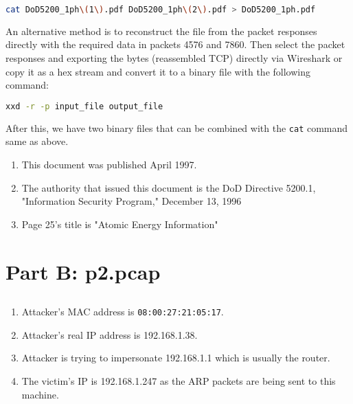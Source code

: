 \documentclass[12pt]{exam}
\begin{document}
\begin{lstlisting}[language=bash]
    cat DoD5200_1ph\(1\).pdf DoD5200_1ph\(2\).pdf > DoD5200_1ph.pdf
\end{lstlisting}

An alternative method is to reconstruct the file from the packet responses
directly with the required data in packets 4576 and 7860.  Then select the
packet responses and exporting the bytes (reassembled TCP) directly via
Wireshark or copy it as a hex stream and convert it to a binary file with the
following command:

\begin{lstlisting}[language=bash]
    xxd -r -p input_file output_file
\end{lstlisting}

After this, we have two binary files that can be combined with the
\lstinline{cat} command same as above.

\begin{enumerate}[label=\alph*)]
    \item This document was published April 1997.
    \item The authority that issued this document is the DoD Directive 5200.1,
    "Information Security Program," December 13, 1996
    \item Page 25's title is "Atomic Energy Information"
\end{enumerate}

\section{Part B: p2.pcap}

\subsection{}

\begin{enumerate}[label=\alph*)]
    \item Attacker's MAC address is \lstinline{08:00:27:21:05:17}.
    \item Attacker's real IP address is 192.168.1.38.
    \item Attacker is trying to impersonate 192.168.1.1 which is usually the
    router.
    \item The victim's IP is 192.168.1.247 as the ARP packets are being sent to
    this machine.
\end{enumerate}

\subsection{}
\end{document}
